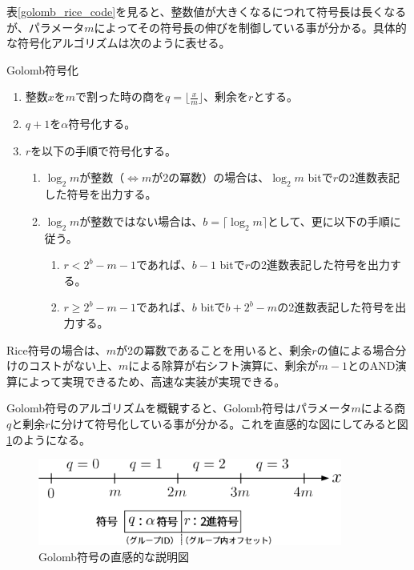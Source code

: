 \documentclass[uplatex,dvipdfmx,b5j,10pt]{jsbook}
\theoremstyle{definition}
\begin{document}
表\ref{golomb_rice_code}を見ると、整数値が大きくなるにつれて符号長は長くなるが、パラメータ$m$によってその符号長の伸びを制御している事が分かる。具体的な符号化アルゴリズムは次のように表せる。
\begin{itembox}[l]{Golomb符号化} \label{golomb_rice_algorithm}
  \begin{enumerate}
    \item 整数$x$を$m$で割った時の商を$q=\lfloor \frac{x}{m} \rfloor$、剰余を$r$とする。
    \item $q+1$を$\alpha$符号化する。
    \item $r$を以下の手順で符号化する。
      \begin{enumerate}
        \item $\log_{2} m$が整数（$\iff$$m$が2の冪数）の場合は、$\log_{2} m$ bitで$r$の2進数表記した符号を出力する。
        \item $\log_{2} m$が整数ではない場合は、$b=\lceil \log_{2} m \rceil$として、更に以下の手順に従う。
          \begin{enumerate}
            \item $r < 2^{b} - m - 1$であれば、$b-1$ bitで$r$の2進数表記した符号を出力する。
            \item $r \geq 2^{b} - m - 1$であれば、$b$ bitで$b + 2^{b} - m$の2進数表記した符号を出力する。
          \end{enumerate}
      \end{enumerate}
  \end{enumerate}
\end{itembox}

Rice符号の場合は、$m$が2の冪数であることを用いると、剰余$r$の値による場合分けのコストがない上、$m$による除算が右シフト演算に、剰余が$m-1$とのAND演算によって実現できるため、高速な実装が実現できる。

Golomb符号のアルゴリズムを概観すると、Golomb符号はパラメータ$m$による商$q$と剰余$r$に分けて符号化している事が分かる。これを直感的な図にしてみると図\ref{golomb_code_explanation}のようになる。
\begin{figure}[htbp]
  \begin{center}
    \includegraphics[width=100mm]{./figs/golomb_code_explanation.png}
  \end{center}
  \caption{Golomb符号の直感的な説明図} \label{golomb_code_explanation}
\end{figure}
\end{document}
